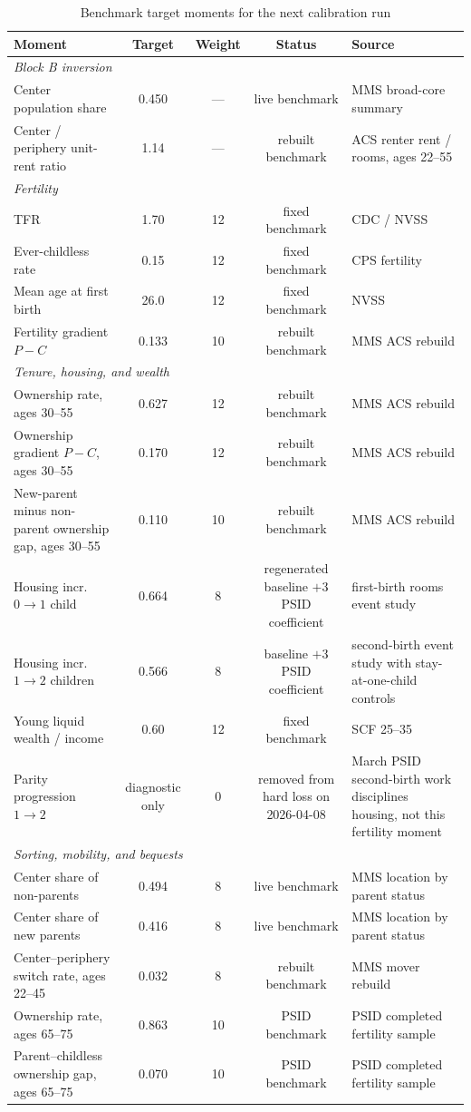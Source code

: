 \documentclass[11pt]{article}
\begin{document}
\begin{table}[!htbp]
\centering
\caption{Benchmark target moments for the next calibration run}
\label{tab:moments}
\begin{tabular}{lcccl}
\toprule
Moment & Target & Weight & Status & Source \\
\midrule
\multicolumn{5}{l}{\emph{Block B inversion}} \\
Center population share & 0.450 & --- & live benchmark & MMS broad-core summary \\
Center / periphery unit-rent ratio & 1.14 & --- & rebuilt benchmark & ACS renter rent / rooms, ages 22--55 \\[0.3em]
\multicolumn{5}{l}{\emph{Fertility}} \\
TFR & 1.70 & 12 & fixed benchmark & CDC / NVSS \\
Ever-childless rate & 0.15 & 12 & fixed benchmark & CPS fertility \\
Mean age at first birth & 26.0 & 12 & fixed benchmark & NVSS \\
Fertility gradient $P-C$ & 0.133 & 10 & rebuilt benchmark & MMS ACS rebuild \\[0.3em]
\multicolumn{5}{l}{\emph{Tenure, housing, and wealth}} \\
Ownership rate, ages 30--55 & 0.627 & 12 & rebuilt benchmark & MMS ACS rebuild \\
Ownership gradient $P-C$, ages 30--55 & 0.170 & 12 & rebuilt benchmark & MMS ACS rebuild \\
New-parent minus non-parent ownership gap, ages 30--55 & 0.110 & 10 & rebuilt benchmark & MMS ACS rebuild \\
Housing incr.\ $0 \to 1$ child & 0.664 & 8 & regenerated baseline $+3$ PSID coefficient & first-birth rooms event study \\
Housing incr.\ $1 \to 2$ children & 0.566 & 8 & baseline $+3$ PSID coefficient & second-birth event study with stay-at-one-child controls \\
Young liquid wealth / income & 0.60 & 12 & fixed benchmark & SCF 25--35 \\
Parity progression $1 \to 2$ & diagnostic only & 0 & removed from hard loss on 2026-04-08 & March PSID second-birth work disciplines housing, not this fertility moment \\[0.3em]
\multicolumn{5}{l}{\emph{Sorting, mobility, and bequests}} \\
Center share of non-parents & 0.494 & 8 & live benchmark & MMS location by parent status \\
Center share of new parents & 0.416 & 8 & live benchmark & MMS location by parent status \\
Center--periphery switch rate, ages 22--45 & 0.032 & 8 & rebuilt benchmark & MMS mover rebuild \\
Ownership rate, ages 65--75 & 0.863 & 10 & PSID benchmark & PSID completed fertility sample \\
Parent--childless ownership gap, ages 65--75 & 0.070 & 10 & PSID benchmark & PSID completed fertility sample \\
\bottomrule
\end{tabular}
\end{table}
\end{document}
